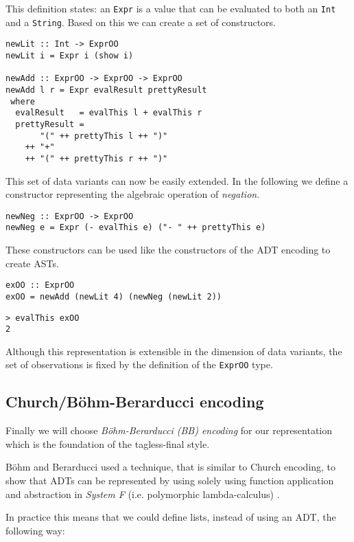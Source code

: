This definition states: an \texttt{Expr} is a value that can be evaluated to
both an \texttt{Int} and a \texttt{String}. Based on this we can create a set of
constructors.

\begin{lstlisting}
newLit :: Int -> ExprOO
newLit i = Expr i (show i)

newAdd :: ExprOO -> ExprOO -> ExprOO
newAdd l r = Expr evalResult prettyResult
 where
  evalResult   = evalThis l + evalThis r
  prettyResult =
       "(" ++ prettyThis l ++ ")"
    ++ "+"
    ++ "(" ++ prettyThis r ++ ")"
\end{lstlisting}

This set of data variants can now be easily extended. In the following we define
a constructor representing the algebraic operation of \emph{negation}.

\begin{lstlisting}
newNeg :: ExprOO -> ExprOO
newNeg e = Expr (- evalThis e) ("- " ++ prettyThis e)
\end{lstlisting}

These constructors can be used like the constructors of the ADT encoding to
create ASTs.

\begin{lstlisting}
exOO :: ExprOO
exOO = newAdd (newLit 4) (newNeg (newLit 2))
\end{lstlisting}
\begin{lstlisting}
> evalThis exOO
2
\end{lstlisting}

Although this representation is extensible in the dimension of data variants,
the set of observations is fixed by the definition of the \texttt{ExprOO} type.

\subsection{Church/Böhm-Berarducci encoding}
\label{subsection_BB_encoding}

Finally we will choose \emph{Böhm-Berarducci (BB) encoding} for our
representation which is the foundation of the tagless-final style.

Böhm and Berarducci used a technique, that is similar to Church
encoding, to show that ADTs can be represented by using solely using function
application and abstraction in \emph{System F} (i.e. polymorphic
lambda-calculus) \cite{boehm_berarducci}.

In practice this means that we could define lists, instead of using an ADT, the
following way:

